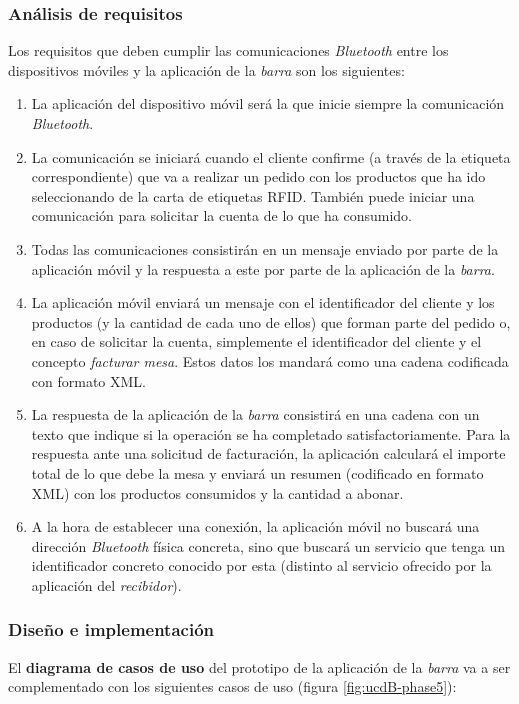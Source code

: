 \subsubsection{Análisis de requisitos}
Los requisitos que deben cumplir las comunicaciones \emph{Bluetooth} entre
los dispositivos móviles y la aplicación de la \emph{barra} son los
siguientes:
\begin{enumerate}
\item La aplicación del dispositivo móvil será la que inicie siempre la
comunicación \emph{Bluetooth}.
\item La comunicación se iniciará cuando el cliente confirme (a través de la
etiqueta correspondiente) que va a realizar un pedido con los productos que ha 
ido seleccionando de la carta de etiquetas \acs{RFID}. También puede iniciar
una comunicación para solicitar la cuenta de lo que ha consumido.
\item Todas las comunicaciones consistirán en un mensaje enviado por parte de
la aplicación móvil y la respuesta a este por parte de la aplicación de la
\emph{barra}.
\item La aplicación móvil enviará un mensaje con el identificador del cliente
y los productos (y la cantidad de cada uno de ellos) que forman parte del
pedido o, en caso de solicitar la cuenta, simplemente el identificador del
cliente y el concepto \emph{facturar mesa}. Estos datos los mandará como una
cadena codificada con formato \acs{XML}.
\item La respuesta de la aplicación de la \emph{barra} consistirá en una cadena 
con un texto que indique si la operación se ha completado satisfactoriamente.
Para la respuesta ante una solicitud de facturación, la aplicación calculará
el importe total de lo que debe la mesa y enviará un resumen (codificado
en formato \acs{XML}) con los productos consumidos y la cantidad a abonar.
\item A la hora de establecer una conexión, la aplicación móvil no buscará una
dirección \emph{Bluetooth} física concreta, sino que buscará un servicio que
tenga un identificador concreto conocido por esta (distinto al servicio
ofrecido por la aplicación del \emph{recibidor}).
\end{enumerate}

\subsubsection{Diseño e implementación}
El \textbf{diagrama de casos de uso} del prototipo de la aplicación de la
\emph{barra} va a ser complementado con los siguientes casos de uso (figura
\ref{fig:ucdB-phase5}):

